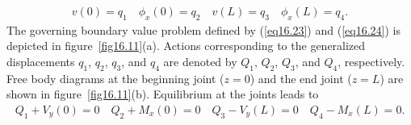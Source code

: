 \documentclass{AeroStructure-ERJohnson}
\begin{document}
\begin{align}\label{eq16.24}
v(0)=q_{1} \quad \phi_{x}(0)=q_{2} \quad v(L)=q_{3} \quad \phi_{x}(L)=q_{4}.
\end{align}
The governing boundary value problem defined by (\ref{eq16.23}) and (\ref{eq16.24}) is depicted in figure~\ref{fig16.11}(a). Actions corresponding to the generalized displacements $q_1$, $q_2$, $q_3$, and $q_4$ are denoted by $\textit{Q}_1$, $\textit{Q}_2$, $\textit{Q}_3$, and $\textit{Q}_4$, respectively. Free body diagrams at the beginning joint ($z = 0$) and the end joint ($z = \textit{L}$) are shown in figure~\ref{fig16.11}(b). Equilibrium at the joints leads to
\begin{align}\label{eq16.25}
Q_{1}+V_{y}(0)=0 \quad Q_{2}+M_{x}(0)=0 \quad Q_{3}-V_{y}(L)=0 \quad Q_{4}-M_{x}(L)=0.
\end{align}

\end{document}
